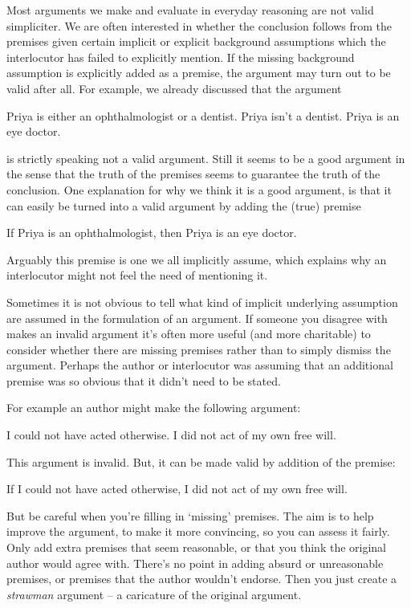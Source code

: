 Most arguments we make and evaluate in everyday reasoning are not valid simpliciter. We are often interested in whether the conclusion follows from the premises given certain implicit or explicit background assumptions which the interlocutor has failed to explicitly mention. If the missing background assumption is explicitly added as a premise, the argument may turn out to be valid after all. For example, we already discussed that the argument
\begin{earg}
	\prem Priya is either an ophthalmologist or a dentist.
	\prem Priya isn't a dentist.
	\conc Priya is an eye doctor.
\end{earg}
is strictly speaking not a valid argument. Still it seems to be a good argument in the sense that the truth of the premises seems to guarantee the truth of the conclusion. One explanation for why we think it is a good argument, is that it can easily be turned into a valid argument by adding the (true) premise
\begin{earg}
\prem If Priya is an ophthalmologist, then Priya is an eye doctor.
\end{earg}
Arguably this premise is one we all implicitly assume, which explains why an interlocutor might not feel the need of mentioning it.

Sometimes it is not obvious to tell what kind of implicit underlying assumption are assumed in the formulation of an argument. If someone you disagree with makes an invalid
argument it’s often more useful (and more charitable) to consider
whether there are missing premises rather than to simply dismiss the argument. Perhaps the author or interlocutor was assuming that an additional
premise was so obvious that it didn’t need to be stated.

For example an author might make the following argument:
\begin{earg}
\prem I could not have acted otherwise.
\conc I did not act of my own free will.
\end{earg}
This argument is invalid. But, it can be made valid by addition of the premise:
\begin{earg}
\prem If I could not have acted otherwise, I did not act of my own free will.
\end{earg}

But be careful when you’re filling in ‘missing’ premises.
The aim is to help improve the argument, to make it
more convincing, so you can assess it fairly.
Only add extra premises that seem reasonable, or that you think
the original author would agree with.
There’s no point in adding absurd or unreasonable
premises, or premises that the author wouldn’t
endorse. Then you just create a \emph{strawman} argument –
a caricature of the original argument.


